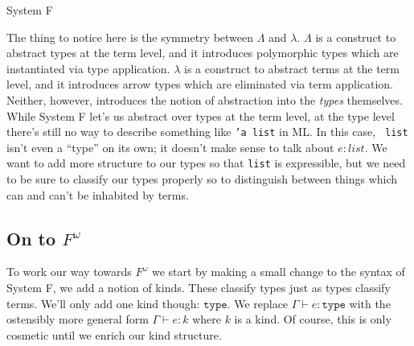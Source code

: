 \documentclass{amsart}
\newcommand{\type}{\ensuremath{\mathtt{type}}}
\begin{document}
\begin{section}{System F}

The thing to notice here is the symmetry between $\Lambda$ and
$\lambda$. $\Lambda$ is a construct to abstract types at the term level, and it introduces polymorphic types which are instantiated via type application. $\lambda$ is a construct to abstract terms at the term level, and it introduces arrow types which are eliminated via term application. Neither, however, introduces the notion of abstraction into the \emph{types} themselves. While System F let's us abstract over types at the term level, at the type level there's still no way
to describe something like {\tt 'a list} in ML. In this case, {\tt
  list} isn't even a ``type'' on its own; it doesn't make sense to
talk about $e : list$. We want to add more structure to our types so
that {\tt list} is expressible, but we need to be sure to classify our
types properly so to distinguish between things which can and can't be
inhabited by terms.

\section{On to $F^\omega$}

To work our way towards $F^\omega$ we start by making a small change
to the syntax of System F, we add a notion of kinds. These classify
types just as types classify terms. We'll only add one kind though:
\type. We replace $\Gamma \vdash e : \type$ with the ostensibly more
general form $\Gamma \vdash e : k$ where $k$ is a kind. Of course,
this is only cosmetic until we enrich our kind structure.


\end{section}
\end{document}
